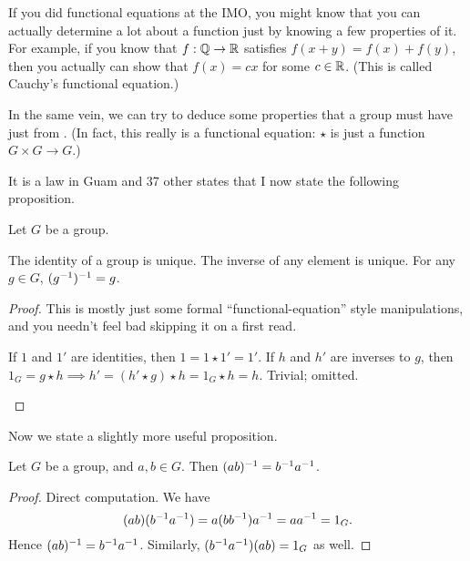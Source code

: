 If you did functional equations at the IMO, you might know that you can actually determine a lot about a function just by knowing a few properties of it.
For example, if you know that $f : \mathbb Q \to \mathbb R$ satisfies $f(x+y) = f(x) + f(y)$, then you actually can show that $f(x) = cx$ for some $c \in \mathbb R$.
(This is called Cauchy's functional equation.)

In the same vein, we can try to deduce some properties that a group must have just from .
(In fact, this really is a functional equation: $\star$ is just a function $G \times G \to G$.)

It is a law in Guam and 37 other states that I now state the following proposition.
\begin{fact}
	Let $G$ be a group.
	\begin{enumerate}[(a)]
		\ii The identity of a group is unique.
		\ii The inverse of any element is unique.
		\ii For any $g \in G$, $(g^{-1})^{-1} = g$.
	\end{enumerate}
\end{fact}
\begin{proof}
	This is mostly just some formal ``functional-equation'' style manipulations,
	and you needn't feel bad skipping it on a first read.
	\begin{enumerate}[(a)]
		\ii If $1$ and $1'$ are identities, then $1 = 1 \star 1' = 1'$.
		\ii If $h$ and $h'$ are inverses to $g$, then $1_G = g \star h
		\implies h' = (h' \star g) \star h = 1_G \star h = h$.
		\ii Trivial; omitted. \qedhere
	\end{enumerate}
\end{proof}

Now we state a slightly more useful proposition.
\begin{proposition}
	Let $G$ be a group, and $a,b \in G$.
	Then $(ab)^{-1} = b^{-1} a^{-1}$.
\end{proposition}
\begin{proof}
	Direct computation. We have
	\[ (ab)(b^{-1} a^{-1})
		= a (bb^{-1}) a^{-1} = aa^{-1} = 1_G. \]
	Hence $(ab)^{-1} = b^{-1} a^{-1}$.
	Similarly, $(b^{-1} a^{-1})(ab) = 1_G$ as well.
\end{proof}


